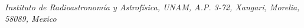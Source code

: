 {    {\morelia}{\it{Instituto de Radioastronom{\'i}a y Astrof{\'i}sica, UNAM, A.P. 3-72, Xangari, Morelia, 58089, Mexico}} \\
    }


